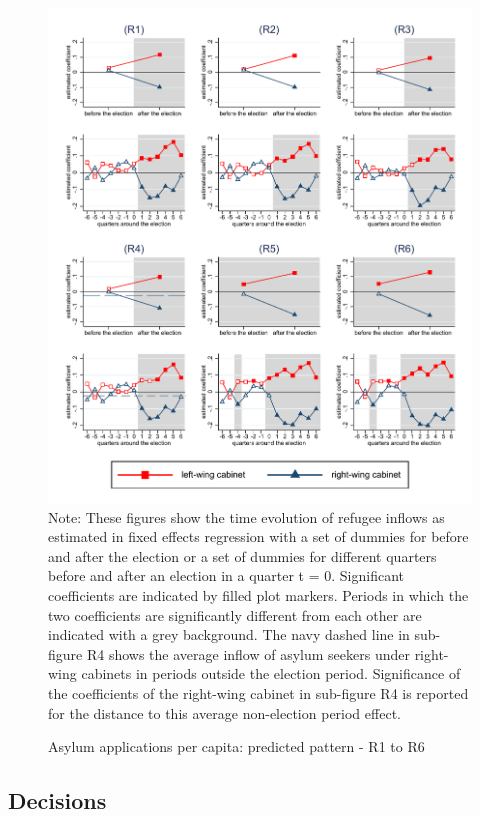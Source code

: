 \documentclass[a4paper,12pt]{article}
\begin{document}
\begin{figure}
	\caption{Asylum applications per capita: predicted pattern - R1 to R6}
	\includegraphics[width=1\textwidth]{../results/applications/app_graphs_R1-R6.pdf}
	\scriptsize{Note: These figures show the time evolution of refugee inflows as estimated in fixed effects regression with a set of dummies for before and after the election or a set of dummies for different quarters before and after an election in a quarter t = 0. Significant coefficients are indicated by filled plot markers. Periods in which the two coefficients are significantly different from each other are indicated with a grey background. The navy dashed line in sub-figure R4 shows the average inflow of asylum seekers under right-wing cabinets in periods outside the election period. Significance of the coefficients of the right-wing cabinet in sub-figure R4 is reported for the distance to this average non-election period effect.}
	\label{graph_robustness}
\end{figure} 

   
\subsection{Decisions}
\end{document}
